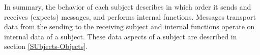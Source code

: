 In summary, the behavior of each subject describes in which order it sends and receives (expects) messages, and performs internal functions. Messages transport data from the sending to the receiving subject and internal functions operate on internal data of a subject. These data aspects of a subject are described in section \ref{SUbjects-Objects}. 







